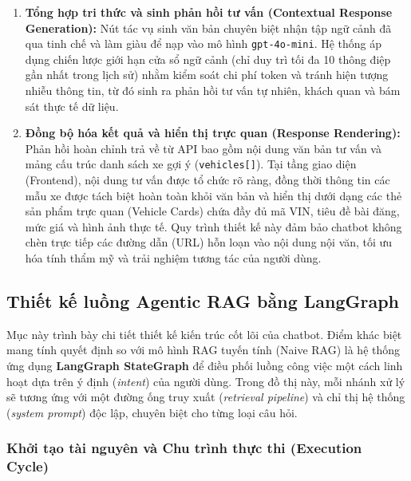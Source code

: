 \begin{enumerate}
    \item \textbf{Tổng hợp tri thức và sinh phản hồi tư vấn (Contextual Response Generation):} Nút tác vụ sinh văn bản chuyên biệt nhận tập ngữ cảnh đã qua tinh chế và làm giàu để nạp vào mô hình \texttt{gpt-4o-mini}. Hệ thống áp dụng chiến lược giới hạn cửa sổ ngữ cảnh (chỉ duy trì tối đa 10 thông điệp gần nhất trong lịch sử) nhằm kiểm soát chi phí token và tránh hiện tượng nhiễu thông tin, từ đó sinh ra phản hồi tư vấn tự nhiên, khách quan và bám sát thực tế dữ liệu.
    
    \item \textbf{Đồng bộ hóa kết quả và hiển thị trực quan (Response Rendering):} Phản hồi hoàn chỉnh trả về từ API bao gồm nội dung văn bản tư vấn và mảng cấu trúc danh sách xe gợi ý (\texttt{vehicles[]}). Tại tầng giao diện (Frontend), nội dung tư vấn được tổ chức rõ ràng, đồng thời thông tin các mẫu xe được tách biệt hoàn toàn khỏi văn bản và hiển thị dưới dạng các thẻ sản phẩm trực quan (Vehicle Cards) chứa đầy đủ mã VIN, tiêu đề bài đăng, mức giá và hình ảnh thực tế. Quy trình thiết kế này đảm bảo chatbot không chèn trực tiếp các đường dẫn (URL) hỗn loạn vào nội dung nội văn, tối ưu hóa tính thẩm mỹ và trải nghiệm tương tác của người dùng.
\end{enumerate}
\subsection{Thiết kế luồng Agentic RAG bằng LangGraph}

Mục này trình bày chi tiết thiết kế kiến trúc cốt lõi của chatbot. Điểm khác biệt mang tính quyết định so với mô hình RAG tuyến tính (Naive RAG) là hệ thống ứng dụng \textbf{LangGraph StateGraph} để điều phối luồng công việc một cách linh hoạt dựa trên ý định (\textit{intent}) của người dùng. Trong đồ thị này, mỗi nhánh xử lý sẽ tương ứng với một đường ống truy xuất (\textit{retrieval pipeline}) và chỉ thị hệ thống (\textit{system prompt}) độc lập, chuyên biệt cho từng loại câu hỏi. 

\subsubsection{Khởi tạo tài nguyên và Chu trình thực thi (Execution Cycle)}


